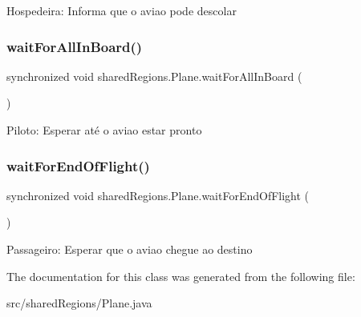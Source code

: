 Hospedeira\+: Informa que o aviao pode descolar \mbox{\label{classshared_regions_1_1_plane_a8520969010cb85cbff07deb3f1a0f003}} 
\subsubsection{\texorpdfstring{wait\+For\+All\+In\+Board()}{waitForAllInBoard()}}
{\footnotesize\ttfamily synchronized void shared\+Regions.\+Plane.\+wait\+For\+All\+In\+Board (\begin{DoxyParamCaption}{ }\end{DoxyParamCaption})\hspace{0.3cm}{\ttfamily [inline]}}

Piloto\+: Esperar até o aviao estar pronto \mbox{\label{classshared_regions_1_1_plane_a5a0b3cd50c5832849185293e70d9725b}} 
\subsubsection{\texorpdfstring{wait\+For\+End\+Of\+Flight()}{waitForEndOfFlight()}}
{\footnotesize\ttfamily synchronized void shared\+Regions.\+Plane.\+wait\+For\+End\+Of\+Flight (\begin{DoxyParamCaption}{ }\end{DoxyParamCaption})\hspace{0.3cm}{\ttfamily [inline]}}

Passageiro\+: Esperar que o aviao chegue ao destino 

The documentation for this class was generated from the following file\+:\begin{DoxyCompactItemize}
\item 
src/shared\+Regions/Plane.\+java\end{DoxyCompactItemize}

